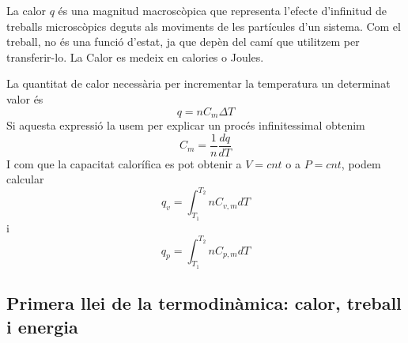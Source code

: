 La calor $q$ és una magnitud macroscòpica que representa l'efecte d'infinitud de treballs microscòpics deguts als moviments de les partícules d'un sistema.
Com el treball, no és una funció d'estat, ja que depèn del camí que utilitzem per transferir-lo.
La Calor es medeix en calories o Joules.

La quantitat de calor necessària per incrementar la temperatura un determinat valor és
\[
q=nC_m\Delta T
\]
Si aquesta expressió la usem per explicar un procés infinitessimal obtenim
\[
C_m=\frac{1}{n}\frac{dq}{dT}
\]
I com que la capacitat calorífica es pot obtenir a $V=cnt$ o a $P=cnt$, podem calcular
\[
q_v=\int_{T_1}^{T_2} n C_{v,m} dT
\]
i
\[
q_p=\int_{T_1}^{T_2} n C_{p,m} dT
\]

\subsection{Primera llei de la termodinàmica: calor, treball i energia}

